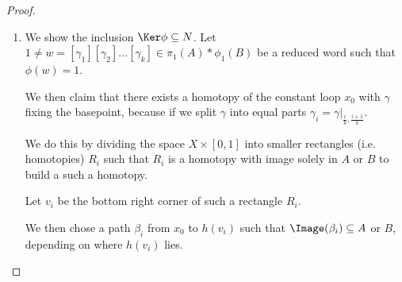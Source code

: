 \begin{proof}
\begin{enumerate}
  \item We show the inclusion $\Ker \phi \subseteq N$.
    Let $1 \neq w= [\gamma_1][\gamma_2] \dots [\gamma_k] \in \pi_1(A) \ast \phi_1(B)$ be a reduced word such that $\phi(w) = 1$.

    We then claim that there exists a homotopy of the constant loop $x_0$ with $\gamma$ fixing the basepoint, because if we split $\gamma$ into equal parts $\gamma_i = \gamma|_{\tfrac{i}{k},\tfrac{i+1}{k}}$.

    We do this by dividing the space $X \times [0,1]$ into smaller rectangles (i.e. homotopies) $R_i$ such that $R_i$ is a homotopy with image solely in $A$ or $B$ to build a such a homotopy.

    Let $v_i$ be the bottom right corner of such a rectangle $R_i$.

    We then chose a path $\beta_i$ from $x_0$ to $h(v_i)$ such that $\Image(\beta_i) \subseteq A$ or $B$, depending on where $h(v_i)$ lies.


\end{enumerate}
\end{proof}
